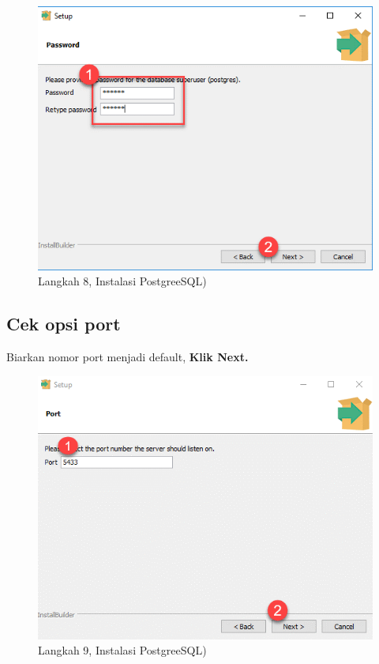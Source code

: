 \documentclass[
]{book}
\begin{document}
\begin{figure}

{\centering \includegraphics[width=1\linewidth]{./images/Bab1/Postgree7} 

}

\caption{Langkah 8, Instalasi PostgreeSQL)}\label{fig:install-posrgree8}
\end{figure}

\hypertarget{cek-opsi-port}{%
\subsection{Cek opsi port}\label{cek-opsi-port}}

Biarkan nomor port menjadi default, \textbf{Klik Next.}

\begin{figure}

{\centering \includegraphics[width=1\linewidth]{./images/Bab1/Postgree8} 

}

\caption{Langkah 9, Instalasi PostgreeSQL)}\label{fig:install-posrgree9}
\end{figure}
\end{document}
